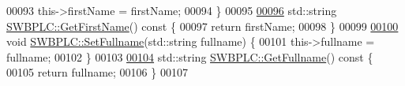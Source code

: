 \begin{DoxyCode}
00093     this->firstName = firstName;
00094 \}
00095 
\hypertarget{_s_w_b_p_l_c_8cpp_source.tex_l00096}{}\hyperlink{class_s_w_b_p_l_c_ace6bbcd6546896e581e3a2ee9504d090}{00096} std::string \hyperlink{class_s_w_b_p_l_c_ace6bbcd6546896e581e3a2ee9504d090}{SWBPLC::GetFirstName}()\textcolor{keyword}{ const }\{
00097     \textcolor{keywordflow}{return} firstName;
00098 \}
00099 
\hypertarget{_s_w_b_p_l_c_8cpp_source.tex_l00100}{}\hyperlink{class_s_w_b_p_l_c_a09376d46475bbceda897948714ff1e72}{00100} \textcolor{keywordtype}{void} \hyperlink{class_s_w_b_p_l_c_a09376d46475bbceda897948714ff1e72}{SWBPLC::SetFullname}(std::string fullname) \{
00101     this->fullname = fullname;
00102 \}
00103 
\hypertarget{_s_w_b_p_l_c_8cpp_source.tex_l00104}{}\hyperlink{class_s_w_b_p_l_c_adb74b3cbc40a401bf7ca4dfb5269c336}{00104} std::string \hyperlink{class_s_w_b_p_l_c_adb74b3cbc40a401bf7ca4dfb5269c336}{SWBPLC::GetFullname}()\textcolor{keyword}{ const }\{
00105     \textcolor{keywordflow}{return} fullname;
00106 \}
00107 
\end{DoxyCode}
